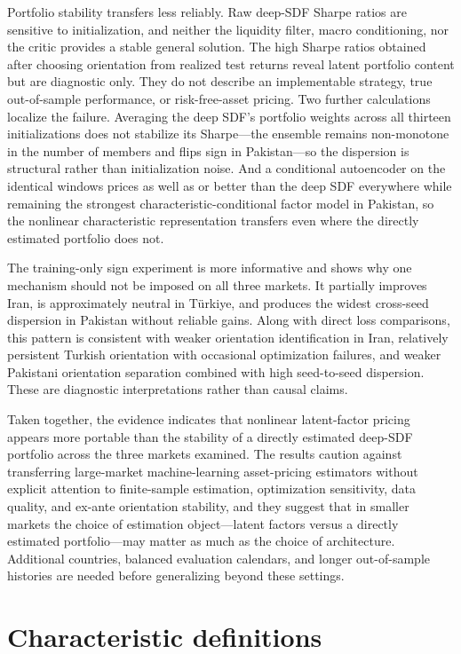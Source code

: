 \documentclass[12pt]{article}
\begin{document}
Portfolio stability transfers less reliably. Raw deep-SDF Sharpe ratios are sensitive to initialization, and neither the liquidity filter, macro conditioning, nor the critic provides a stable general solution. The high Sharpe ratios obtained after choosing orientation from realized test returns reveal latent portfolio content but are diagnostic only. They do not describe an implementable strategy, true out-of-sample performance, or risk-free-asset pricing. Two further calculations localize the failure. Averaging the deep SDF's portfolio weights across all thirteen initializations does not stabilize its Sharpe---the ensemble remains non-monotone in the number of members and flips sign in Pakistan---so the dispersion is structural rather than initialization noise. And a conditional autoencoder on the identical windows prices as well as or better than the deep SDF everywhere while remaining the strongest characteristic-conditional factor model in Pakistan, so the nonlinear characteristic representation transfers even where the directly estimated portfolio does not.

The training-only sign experiment is more informative and shows why one mechanism should not be imposed on all three markets. It partially improves Iran, is approximately neutral in T\"urkiye, and produces the widest cross-seed dispersion in Pakistan without reliable gains. Along with direct loss comparisons, this pattern is consistent with weaker orientation identification in Iran, relatively persistent Turkish orientation with occasional optimization failures, and weaker Pakistani orientation separation combined with high seed-to-seed dispersion. These are diagnostic interpretations rather than causal claims.

Taken together, the evidence indicates that nonlinear latent-factor pricing appears more portable than the stability of a directly estimated deep-SDF portfolio across the three markets examined. The results caution against transferring large-market machine-learning asset-pricing estimators without explicit attention to finite-sample estimation, optimization sensitivity, data quality, and ex-ante orientation stability, and they suggest that in smaller markets the choice of estimation object---latent factors versus a directly estimated portfolio---may matter as much as the choice of architecture. Additional countries, balanced evaluation calendars, and longer out-of-sample histories are needed before generalizing beyond these settings.

\appendix
\section{Characteristic definitions}\label{app:chars}
\end{document}
